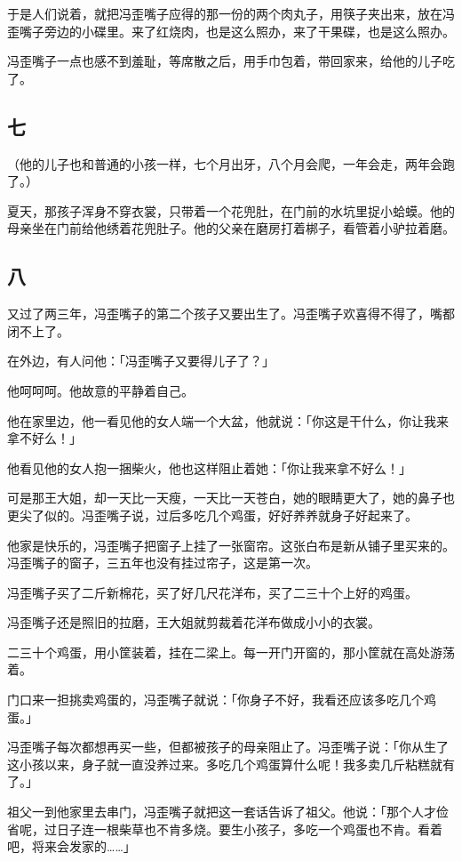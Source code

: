 \documentclass[UTF8]{ctexart}
\begin{document}
于是人们说着，就把冯歪嘴子应得的那一份的两个肉丸子，用筷子夹出来，放在冯歪嘴子旁边的小碟里。来了红烧肉，也是这么照办，来了干果碟，也是这么照办。

冯歪嘴子一点也感不到羞耻，等席散之后，用手巾包着，带回家来，给他的儿子吃了。

\subsection{七}

（他的儿子也和普通的小孩一样，七个月出牙，八个月会爬，一年会走，两年会跑了。）

夏天，那孩子浑身不穿衣裳，只带着一个花兜肚，在门前的水坑里捉小蛤蟆。他的母亲坐在门前给他绣着花兜肚子。他的父亲在磨房打着梆子，看管着小驴拉着磨。

\subsection{八}

又过了两三年，冯歪嘴子的第二个孩子又要出生了。冯歪嘴子欢喜得不得了，嘴都闭不上了。

在外边，有人问他：「冯歪嘴子又要得儿子了？」

他呵呵呵。他故意的平静着自己。

他在家里边，他一看见他的女人端一个大盆，他就说：「你这是干什么，你让我来拿不好么！」

他看见他的女人抱一捆柴火，他也这样阻止着她：「你让我来拿不好么！」

可是那王大姐，却一天比一天瘦，一天比一天苍白，她的眼睛更大了，她的鼻子也更尖了似的。冯歪嘴子说，过后多吃几个鸡蛋，好好养养就身子好起来了。

他家是快乐的，冯歪嘴子把窗子上挂了一张窗帘。这张白布是新从铺子里买来的。冯歪嘴子的窗子，三五年也没有挂过帘子，这是第一次。

冯歪嘴子买了二斤新棉花，买了好几尺花洋布，买了二三十个上好的鸡蛋。

冯歪嘴子还是照旧的拉磨，王大姐就剪裁着花洋布做成小小的衣裳。

二三十个鸡蛋，用小筐装着，挂在二梁上。每一开门开窗的，那小筐就在高处游荡着。

门口来一担挑卖鸡蛋的，冯歪嘴子就说：「你身子不好，我看还应该多吃几个鸡蛋。」

冯歪嘴子每次都想再买一些，但都被孩子的母亲阻止了。冯歪嘴子说：「你从生了这小孩以来，身子就一直没养过来。多吃几个鸡蛋算什么呢！我多卖几斤粘糕就有了。」

祖父一到他家里去串门，冯歪嘴子就把这一套话告诉了祖父。他说：「那个人才俭省呢，过日子连一根柴草也不肯多烧。要生小孩子，多吃一个鸡蛋也不肯。看着吧，将来会发家的……」
\end{document}
